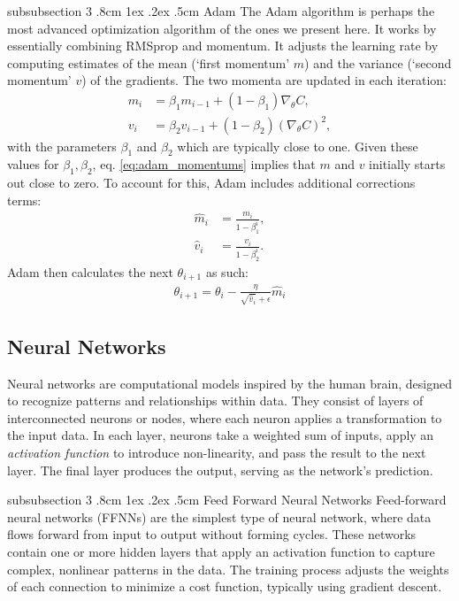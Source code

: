 \documentclass[%
reprint,s
amsmath,amssymb,
aps,
]{revtex4-2}
\makeatletter
\renewcommand{\subsubsection}{%
	\@startsection
	{subsubsection}%
	{3}%
	{\z@}%
	{.8cm \@plus1ex \@minus .2ex}%
	{.5cm}%
	{\normalfont\small\centering}%
}
\makeatother
\begin{document}
\subsubsection{Adam}
The Adam algorithm is perhaps the most advanced optimization algorithm of the ones we present here. It works by essentially combining RMSprop and momentum. It adjusts the learning rate by computing estimates of the mean (`first momentum' \(m\)) and the variance (`second momentum' \(v\)) of the gradients. The two momenta are updated in each iteration:
\begin{align}	\label{eq:adam_momentums}
	m_i&=\beta_1m_{i-1}+(1-\beta_1) \nabla_\theta C,\\
    v_i&=\beta_2v_{i-1}+(1-\beta_2) (\nabla_\theta C)^2,
\end{align}
with the parameters \(\beta_1\) and \(\beta_2\) which are typically close to one. Given these values for \(\beta_1, \beta_2\), eq. \eqref{eq:adam_momentums} implies that \(m\) and \(v\) initially starts out close to zero. To account for this, Adam includes additional corrections terms:
\begin{align}
	\hat{m}_i &=\frac{m_i}{1-\beta_1^i},\\
    \hat{v}_i &=\frac{v_i}{1-\beta_2^i}.
\end{align}
Adam then calculates the next \(\theta_{i+1}\) as such:
\begin{align}
	\theta_{i+1}=\theta_{i}-\frac{\eta}{\sqrt{\hat{v}_i}+\epsilon}\hat{m}_i
\end{align}



\subsection{Neural Networks}	\label{sec:neutral_networks}
Neural networks are computational models inspired by the human brain, designed to recognize patterns and relationships within data. They consist of layers of interconnected neurons or nodes, where each neuron applies a transformation to the input data. In each layer, neurons take a weighted sum of inputs, apply an \textit{activation function} to introduce non-linearity, and pass the result to the next layer. The final layer produces the output, serving as the network’s prediction.

\subsubsection{Feed Forward Neural Networks}
Feed-forward neural networks (FFNNs) are the simplest type of neural network, where data flows forward from input to output without forming cycles. These networks contain one or more hidden layers that apply an activation function to capture complex, nonlinear patterns in the data. The training process adjusts the weights of each connection to minimize a cost function, typically using gradient descent.
\end{document}
